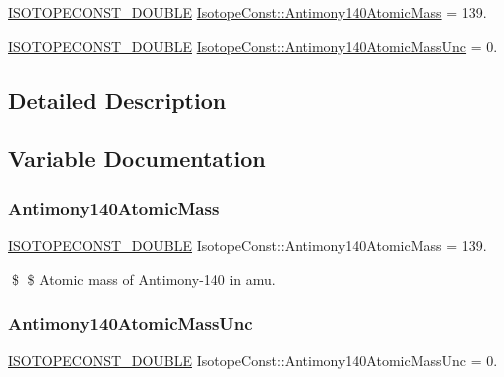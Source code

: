 \begin{DoxyCompactItemize}
\item 
\mbox{\hyperlink{group___isotope_const-_macros_ga8f45a7272ce02c0b4c65c44636ed719a}{I\+S\+O\+T\+O\+P\+E\+C\+O\+N\+S\+T\+\_\+\+D\+O\+U\+B\+LE}} \mbox{\hyperlink{group___isotope_const-_antimony-_sb140_gab1395d82fbbac0b3a60c0646b2794bc5}{Isotope\+Const\+::\+Antimony140\+Atomic\+Mass}} = 139.
\item 
\mbox{\hyperlink{group___isotope_const-_macros_ga8f45a7272ce02c0b4c65c44636ed719a}{I\+S\+O\+T\+O\+P\+E\+C\+O\+N\+S\+T\+\_\+\+D\+O\+U\+B\+LE}} \mbox{\hyperlink{group___isotope_const-_antimony-_sb140_ga437b32a27cb9411732909153363209c5}{Isotope\+Const\+::\+Antimony140\+Atomic\+Mass\+Unc}} = 0.
\end{DoxyCompactItemize}


\subsection{Detailed Description}


\subsection{Variable Documentation}
\mbox{\label{group___isotope_const-_antimony-_sb140_gab1395d82fbbac0b3a60c0646b2794bc5}} 
\subsubsection{\texorpdfstring{Antimony140\+Atomic\+Mass}{Antimony140AtomicMass}}
{\footnotesize\ttfamily \mbox{\hyperlink{group___isotope_const-_macros_ga8f45a7272ce02c0b4c65c44636ed719a}{I\+S\+O\+T\+O\+P\+E\+C\+O\+N\+S\+T\+\_\+\+D\+O\+U\+B\+LE}} Isotope\+Const\+::\+Antimony140\+Atomic\+Mass = 139.}

\$ \$ Atomic mass of Antimony-\/140 in amu. \mbox{\label{group___isotope_const-_antimony-_sb140_ga437b32a27cb9411732909153363209c5}} 
\subsubsection{\texorpdfstring{Antimony140\+Atomic\+Mass\+Unc}{Antimony140AtomicMassUnc}}
{\footnotesize\ttfamily \mbox{\hyperlink{group___isotope_const-_macros_ga8f45a7272ce02c0b4c65c44636ed719a}{I\+S\+O\+T\+O\+P\+E\+C\+O\+N\+S\+T\+\_\+\+D\+O\+U\+B\+LE}} Isotope\+Const\+::\+Antimony140\+Atomic\+Mass\+Unc = 0.}

